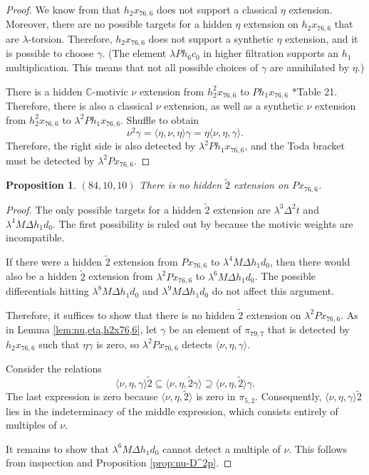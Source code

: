 \documentclass{amsart}
\newtheorem{prop}[thm]{Proposition}
\theoremstyle{definition}
\newcommand{\C}{\mathbb{C}}
\newcommand{\hsf}{\widetilde{2}}
\newcommand{\lemdeg}[1]{$({#1})$}
\newcommand{\D}{\Delta}
\begin{document}
\begin{proof}
We know from \cite{IWX} that $h_2 x_{76,6}$ does not support a classical
$\eta$ extension.  Moreover, there are no possible targets for a
hidden $\eta$ extension on $h_2 x_{76,6}$ that are $\lambda$-torsion.
Therefore, $h_2 x_{76,6}$ does not support a synthetic $\eta$ extension,
and it is possible to choose $\gamma$.
(The element $\lambda P h_6 c_0$ in higher filtration supports an
$h_1$ multiplication.  This means that not all possible choices of $\gamma$
are annihilated by $\eta$.)

There is a hidden $\C$-motivic
$\nu$ extension from $h_2^2 x_{76,6}$ to $P h_1 x_{76,6}$ \cite{IWX}*{Table 21}.
Therefore, there is also a classical $\nu$ extension, as well
as a synthetic $\nu$ extension from $h_2^2 x_{76,6}$ to
$\lambda^2 P h_1 x_{76,6}$.
Shuffle to obtain
\[
\nu^2 \gamma = \langle \eta, \nu, \eta \rangle \gamma =
\eta \langle \nu, \eta, \gamma \rangle.
\]
Therefore, the right side is also detected by $\lambda^2 P h_1 x_{76,6}$,
and the Toda bracket must be detected by $\lambda^2 P x_{76,6}$.
\end{proof}



\begin{prop}
\label{prop:h-Px76,6}
\lemdeg{84, 10, 10}
There is no hidden $\hsf$ extension on $P x_{76,6}$.
\end{prop}

\begin{proof}
The only possible targets for a hidden $\hsf$ extension are
$\lambda^3 \D^2 t$ and $\lambda^4 M \D h_1 d_0$.
The first possibility is ruled out by \cite{IWX} because the
motivic weights are incompatible.

If there were a hidden $\hsf$ extension 
from $P x_{76,6}$ to $\lambda^4 M \D h_1 d_0$,
then there would also be a hidden $\hsf$ extension from
$\lambda^2 P x_{76,6}$ to $\lambda^6 M \D h_1 d_0$.
The possible differentials hitting $\lambda^8 M \D h_1 d_0$
and $\lambda^9 M \D h_1 d_0$
do not affect this argument.

Therefore, it suffices to show that there is no hidden $\hsf$ extension
on $\lambda^2 P x_{76,6}$.
As in Lemma \ref{lem:nu,eta,h2x76,6}, let $\gamma$
be an element of $\pi_{79,7}$ that is detected by
$h_2 x_{76,6}$ such that $\eta \gamma$ is zero,
so $\lambda^2 P x_{76,6}$ detects $\langle \nu, \eta, \gamma \rangle$.

Consider the relations
\[
\langle \nu, \eta, \gamma \rangle \hsf \subseteq
\langle \nu, \eta, \hsf \gamma \rangle \supseteq
\langle \nu, \eta, \hsf \rangle \gamma.
\]
The last expression is zero because $\langle \nu, \eta, \hsf \rangle$
is zero in $\pi_{5,2}$.
Consequently,
$\langle \nu, \eta, \gamma \rangle \hsf$ lies in the indeterminacy
of the middle expression, which consists entirely of multiples of
$\nu$.

It remains to show that $\lambda^6 M \D h_1 d_0$ cannot detect
a multiple of $\nu$.  This follows from inspection and
Proposition \ref{prop:nu-D^2p}.
\end{proof}
\end{document}
